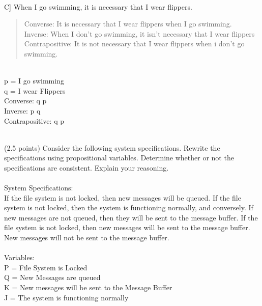 \documentclass[9pt]{article}
\begin{document}
\\
C] When I go swimming, it is necessary that I wear flippers.\\
\begin{quote}
	Converse: It is necessary that I wear flippers when I go swimming. \\
	Inverse: When I don't go swimming, it isn't necessary that I wear flippers\\
	Contrapositive: It is not necessary that I wear flippers when i don't go swimming.\\
	\end{quote}
	\\
	p = I go swimming \\ q = I wear Flippers \\
	Converse: q \to p\\
	Inverse: \lnot p \to \lnot q\\
	Contrapositive: \lnot q \to \lnot p\\
\\
\vspace{10mm}
\newpage
\vspace{5mm}
\item (2.5 points) Consider the following system specifications. Rewrite the
specifications using propositional variables. Determine whether or not the
specifications are consistent. Explain your reasoning.\\
\\
System Specifications:\\
If the file system is not locked, then new messages will be queued. If the file
system is not locked, then the system is functioning normally, and conversely. If
new messages are not queued, then they will be sent to the message buffer. If the
file system is not locked, then new messages will be sent to the message buffer.
New messages will not be sent to the message buffer.
\\ \\
Variables: \\P = File System is Locked \\ Q = New Messages are queued \\ K = New messages will be sent to the Message Buffer \\ J = The system is functioning normally \\ 
\end{document}
